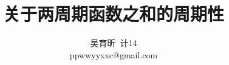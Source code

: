 \documentclass[a4paper]{article}
\title{关于两周期函数之和的周期性}
\author{吴育昕~计14 \\ ppwwyyxxc@gmail.com}
\date{}
\begin{document}
\maketitle

\nocite{adv_alg}\nocite{ideals}\nocite{using}\nocite{lc}\nocite{poly_alg}

\end{document}
